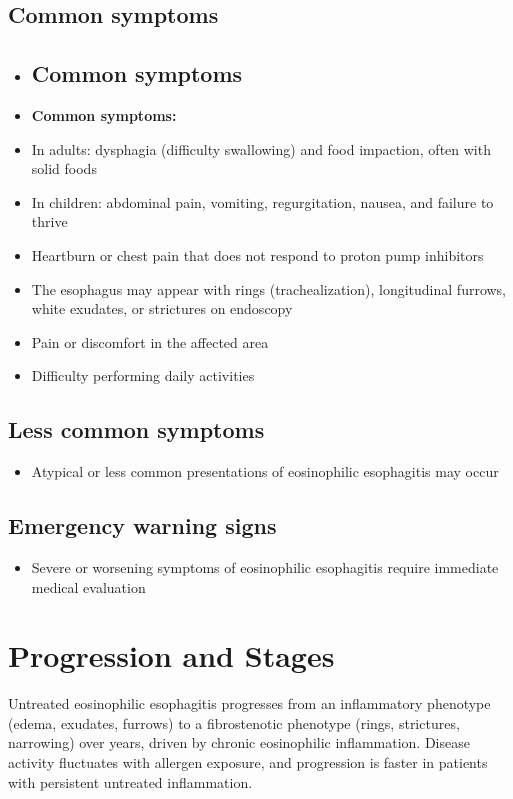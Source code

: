 \subsection{Common symptoms}
\begin{itemize}[noitemsep]
  \item \subsection{Common symptoms}
  \item \textbf{Common symptoms:}
  \item In adults: dysphagia (difficulty swallowing) and food impaction, often with solid foods
  \item In children: abdominal pain, vomiting, regurgitation, nausea, and failure to thrive
  \item Heartburn or chest pain that does not respond to proton pump inhibitors
  \item The esophagus may appear with rings (trachealization), longitudinal furrows, white exudates, or strictures on endoscopy
  \item Pain or discomfort in the affected area
  \item Difficulty performing daily activities
\end{itemize}

\subsection{Less common symptoms}
\begin{itemize}[noitemsep]
  \item Atypical or less common presentations of eosinophilic esophagitis may occur
\end{itemize}

\subsection{Emergency warning signs}
\begin{itemize}[noitemsep]
  \item Severe or worsening symptoms of eosinophilic esophagitis require immediate medical evaluation
\end{itemize}
\section{Progression and Stages}
Untreated eosinophilic esophagitis progresses from an inflammatory phenotype (edema, exudates, furrows) to a fibrostenotic phenotype (rings, strictures, narrowing) over years, driven by chronic eosinophilic inflammation. Disease activity fluctuates with allergen exposure, and progression is faster in patients with persistent untreated inflammation.

